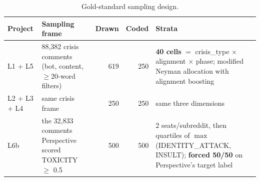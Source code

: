 \begin{table}[h]
  \caption{Gold-standard sampling design.}
  \label{tab:sampling}
  \footnotesize
  \begin{tabular}{@{}lp{4.3cm}rrp{4.6cm}@{}}
    \toprule
    Project & Sampling frame & Drawn & Coded & Strata \\
    \midrule
    L1 + L5 & 88{,}382 crisis comments (bot, content, $\ge$20-word filters) & 619 & 250 & \textbf{40 cells} $=$ crisis\_type $\times$ alignment $\times$ phase; modified Neyman allocation with alignment boosting \\
    L2 + L3 + L4 & same crisis frame & 250 & 250 & same three dimensions \\
    L6b & the 32{,}833 comments Perspective scored TOXICITY $\ge$ 0.5 & 500 & 500 & 2 seats/subreddit, then quartiles of $\max$(IDENTITY\_ATTACK, INSULT); \textbf{forced 50/50} on Perspective's target label \\
    \bottomrule
  \end{tabular}
\end{table}
